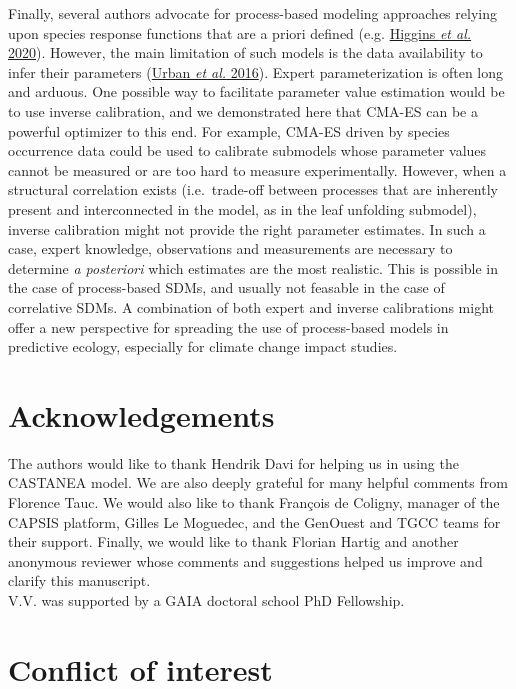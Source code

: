 \documentclass[11pt,]{article}
\begin{document}
Finally, several authors advocate for process-based modeling approaches
relying upon species response functions that are a priori defined (e.g.
\protect\hyperlink{ref-Higgins2020}{Higgins \emph{et al.} 2020}).
However, the main limitation of such models is the data availability to
infer their parameters (\protect\hyperlink{ref-Urban2016}{Urban \emph{et
al.} 2016}). Expert parameterization is often long and arduous. One
possible way to facilitate parameter value estimation would be to use
inverse calibration, and we demonstrated here that CMA-ES can be a
powerful optimizer to this end. For example, CMA-ES driven by species
occurrence data could be used to calibrate submodels whose parameter
values cannot be measured or are too hard to measure experimentally.
However, when a structural correlation exists (i.e.~trade-off between
processes that are inherently present and interconnected in the model,
as in the leaf unfolding submodel), inverse calibration might not
provide the right parameter estimates. In such a case, expert knowledge,
observations and measurements are necessary to determine \emph{a
posteriori} which estimates are the most realistic. This is possible in
the case of process-based SDMs, and usually not feasable in the case of
correlative SDMs. A combination of both expert and inverse calibrations
might offer a new perspective for spreading the use of process-based
models in predictive ecology, especially for climate change impact
studies.

\hypertarget{acknowledgements}{%
\section{Acknowledgements}\label{acknowledgements}}

The authors would like to thank Hendrik Davi for helping us in using the
CASTANEA model. We are also deeply grateful for many helpful comments
from Florence Tauc. We would also like to thank François de Coligny,
manager of the CAPSIS platform, Gilles Le Moguedec, and the GenOuest and
TGCC teams for their support. Finally, we would like to thank Florian
Hartig and another anonymous reviewer whose comments and suggestions
helped us improve and clarify this manuscript.\\
V.V. was supported by a GAIA doctoral school PhD Fellowship.

\hypertarget{conflict-of-interest}{%
\section{Conflict of interest}\label{conflict-of-interest}}
\end{document}
